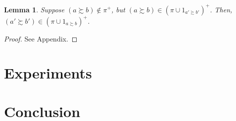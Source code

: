 \documentclass[conference]{ieeeconf}
\newcommand{\prefers}{\succsim}
\newtheorem{lemma}{Lemma}
\begin{document}
\begin{lemma}
    Suppose $(a \prefers b) \notin \pi^{+}$, but $(a \prefers b) \in \left(\pi \cup 1_{a' \prefers b'}\right)^{+}$. Then, $(a' \prefers b') \in \left( \pi \cup 1_{a \prefers b} \right)^{+}$.
\end{lemma}
\begin{proof}
    See Appendix.
\end{proof}

\section{Experiments}


\section{Conclusion}





\appendix
\end{document}
